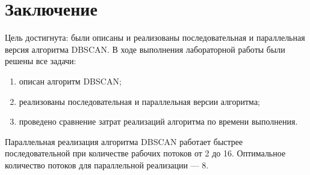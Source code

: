 \chapter*{Заключение}

Цель достигнута: были описаны и реализованы последовательная и параллельная версия алгоритма DBSCAN. В ходе выполнения лабораторной работы были решены все задачи:
\begin{enumerate}
	\item описан алгоритм DBSCAN;
	\item реализованы последовательная и параллельная версии алгоритма;
	\item проведено сравнение затрат реализаций алгоритма по времени выполнения.
\end{enumerate}

Параллельная реализация алгоритма DBSCAN работает быстрее последовательной при количестве рабочих потоков от 2 до 16.
Оптимальное количество потоков для параллельной реализации --- 8.


